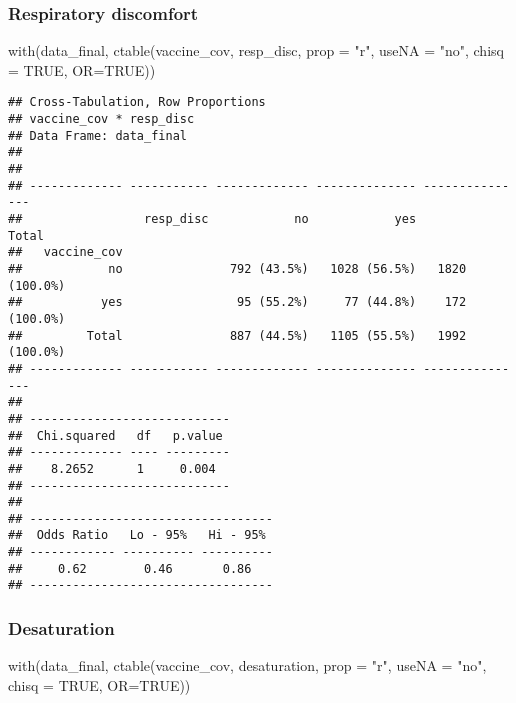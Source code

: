 \documentclass[
]{article}
\newenvironment{Shaded}{\begin{snugshade}}{\end{snugshade}}
\newcommand{\AttributeTok}[1]{\textcolor[rgb]{0.77,0.63,0.00}{#1}}
\newcommand{\ConstantTok}[1]{\textcolor[rgb]{0.00,0.00,0.00}{#1}}
\newcommand{\FunctionTok}[1]{\textcolor[rgb]{0.00,0.00,0.00}{#1}}
\newcommand{\NormalTok}[1]{#1}
\newcommand{\StringTok}[1]{\textcolor[rgb]{0.31,0.60,0.02}{#1}}
\begin{document}
\hypertarget{respiratory-discomfort}{%
\subsubsection{Respiratory discomfort}\label{respiratory-discomfort}}

\begin{Shaded}
\begin{Highlighting}[]
\FunctionTok{with}\NormalTok{(data\_final, }\FunctionTok{ctable}\NormalTok{(vaccine\_cov, resp\_disc, }\AttributeTok{prop =} \StringTok{"r"}\NormalTok{, }\AttributeTok{useNA =} \StringTok{"no"}\NormalTok{, }\AttributeTok{chisq =} \ConstantTok{TRUE}\NormalTok{, }\AttributeTok{OR=}\ConstantTok{TRUE}\NormalTok{))}
\end{Highlighting}
\end{Shaded}

\begin{verbatim}
## Cross-Tabulation, Row Proportions  
## vaccine_cov * resp_disc  
## Data Frame: data_final  
## 
## 
## ------------- ----------- ------------- -------------- ---------------
##                 resp_disc            no            yes           Total
##   vaccine_cov                                                         
##            no               792 (43.5%)   1028 (56.5%)   1820 (100.0%)
##           yes                95 (55.2%)     77 (44.8%)    172 (100.0%)
##         Total               887 (44.5%)   1105 (55.5%)   1992 (100.0%)
## ------------- ----------- ------------- -------------- ---------------
## 
## ----------------------------
##  Chi.squared   df   p.value 
## ------------- ---- ---------
##    8.2652      1     0.004  
## ----------------------------
## 
## ----------------------------------
##  Odds Ratio   Lo - 95%   Hi - 95% 
## ------------ ---------- ----------
##     0.62        0.46       0.86   
## ----------------------------------
\end{verbatim}

\hypertarget{desaturation}{%
\subsubsection{Desaturation}\label{desaturation}}

\begin{Shaded}
\begin{Highlighting}[]
\FunctionTok{with}\NormalTok{(data\_final, }\FunctionTok{ctable}\NormalTok{(vaccine\_cov, desaturation, }\AttributeTok{prop =} \StringTok{"r"}\NormalTok{, }\AttributeTok{useNA =} \StringTok{"no"}\NormalTok{, }\AttributeTok{chisq =} \ConstantTok{TRUE}\NormalTok{, }\AttributeTok{OR=}\ConstantTok{TRUE}\NormalTok{))}
\end{Highlighting}
\end{Shaded}
\end{document}
